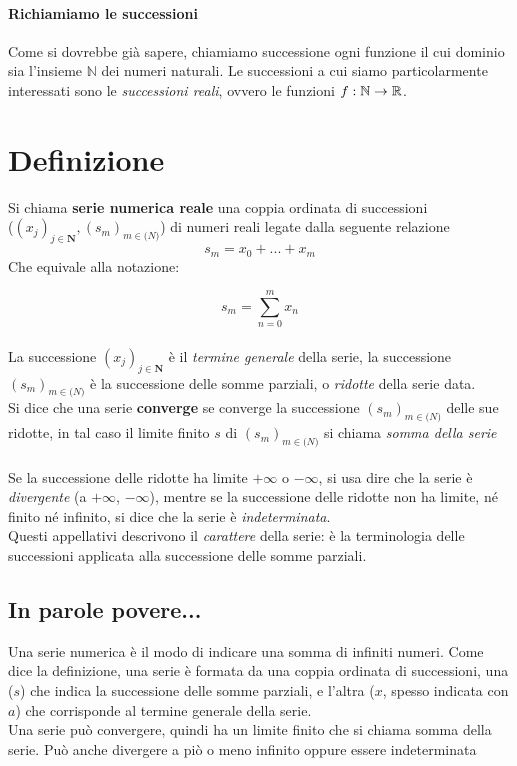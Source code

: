 \documentclass[12pt, a4paper, openany]{book}
\begin{document}
\paragraph*{Richiamiamo le successioni}
Come si dovrebbe già sapere, chiamiamo successione ogni funzione il cui dominio sia l'insieme $\mathbb{N}$ dei numeri naturali.
Le successioni a cui siamo particolarmente interessati sono le \emph{successioni reali}, ovvero le funzioni $f : \mathbb{N} \rightarrow \mathbb{R}$.
\section{Definizione}
Si chiama \textbf{serie numerica reale} una coppia ordinata di successioni \\
($(x_j)_{j\in \mathbf{N}}, (s_m)_{m\in \mathbf(N)}$) di numeri reali legate dalla seguente relazione
\begin{equation*}
    s_m = x_0 + ... + x_m
\end{equation*}
Che equivale alla notazione:

\begin{equation*}
    \boxed{s_m = \sum_{n=0}^m x_n}
\end{equation*}
\paragraph*{}La successione $(x_j)_{j\in \mathbf{N}}$ è il \emph{termine generale} della serie, la successione $(s_m)_{m\in \mathbf(N)}$ è la successione delle somme parziali, o \emph{ridotte} della serie data.\\
Si dice che una serie \textbf{converge} se converge la successione $(s_m)_{m\in \mathbf(N)}$ delle sue ridotte, in tal caso il limite finito $s$ di $(s_m)_{m\in \mathbf(N)}$ si chiama \emph{somma della serie}
\paragraph*{}Se la successione delle ridotte ha limite $+ \infty$ o $- \infty$, si usa dire che la serie è \emph{divergente} (a $+ \infty$, $- \infty$), mentre se la successione delle ridotte non ha limite, né finito né infinito, si dice che la serie è \emph{indeterminata}.
\\Questi appellativi descrivono il \emph{carattere} della serie: è  la terminologia delle successioni applicata alla successione delle somme parziali. 

\subsection*{In parole povere...}
Una serie numerica è il modo di indicare una somma di infiniti numeri.
Come dice la definizione, una serie è formata da una coppia ordinata di successioni, una ($s$) che indica la successione delle somme parziali, e l'altra ($x$, spesso indicata con $a$) che corrisponde al termine generale della serie.
\\Una serie può convergere, quindi ha un limite finito che si chiama somma della serie. Può anche divergere a piò o meno infinito oppure essere indeterminata
\end{document}
